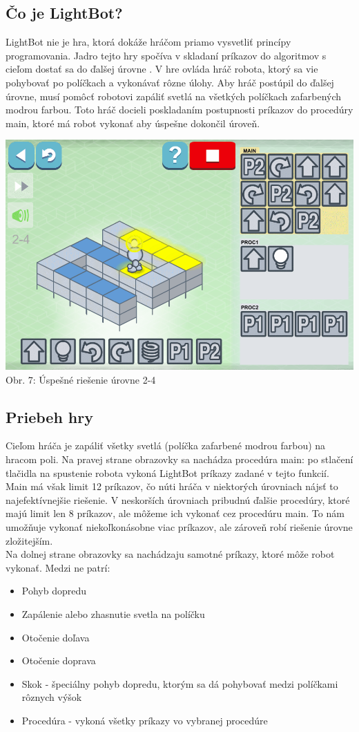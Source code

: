 \documentclass[slovak,a4paper,11pt]{article}
\begin{document}
\subsection{Čo je LightBot?}
LightBot nie je hra, ktorá dokáže hráčom priamo vysvetliť princípy programovania. Jadro tejto hry spočíva v skladaní príkazov do algoritmov s cieľom dostať sa do ďalšej úrovne \cite{combefis2016learning}. V hre ovláda hráč robota, ktorý sa vie pohybovať po políčkach a vykonávať rôzne úlohy. Aby hráč postúpil do ďalšej úrovne, musí pomôcť robotovi zapáliť svetlá na všetkých políčkach zafarbených modrou farbou. Toto hráč docieli poskladaním postupnosti príkazov do procedúry main, ktoré má robot vykonať aby úspešne dokončil úroveň. \\
\begin{center}
\includegraphics[scale=0.3]{lightbotmain}
\\ Obr. 7: Úspešné riešenie úrovne 2-4
\end{center}
\subsection{Priebeh hry}
Cieľom hráča je zapáliť všetky svetlá (políčka zafarbené modrou farbou) na hracom poli. Na pravej strane obrazovky sa nachádza procedúra main: po stlačení tlačidla na spustenie robota vykoná LightBot príkazy zadané v tejto funkcií. Main má však limit 12 príkazov, čo núti hráča v niektorých úrovniach nájsť to najefektívnejšie riešenie. V neskorších úrovniach pribudnú ďalšie procedúry, ktoré majú limit len 8 príkazov, ale môžeme ich vykonať cez procedúru main. To nám umožňuje vykonať niekoľkonásobne viac príkazov, ale zároveň robí riešenie úrovne zložitejším. \\
Na dolnej strane obrazovky sa nachádzaju samotné príkazy, ktoré môže robot vykonať. Medzi ne patrí:
\begin{itemize}
\item Pohyb dopredu
\item Zapálenie alebo zhasnutie svetla na políčku
\item Otočenie doľava
\item Otočenie doprava
\item Skok - špeciálny pohyb dopredu, ktorým sa dá pohybovať medzi políčkami rôznych výšok
\item Procedúra - vykoná všetky príkazy vo vybranej procedúre
\end{itemize}
\end{document}
